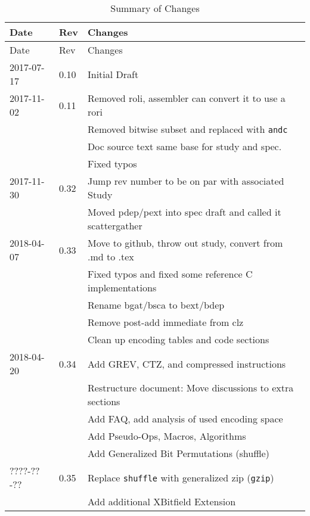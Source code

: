 \documentclass[twoside,11pt]{book}
\begin{document}
\begin{longtable}[c]{@{}lll@{}}
\caption{Summary of Changes}\tabularnewline
\toprule
Date & Rev & Changes\tabularnewline
\midrule
\endfirsthead
\toprule
Date & Rev & Changes\tabularnewline
\midrule
\endhead
2017-07-17 & 0.10 & Initial Draft\tabularnewline
2017-11-02 & 0.11 & Removed roli, assembler can convert it to use a rori\tabularnewline
           &      & Removed bitwise subset and replaced with \texttt{andc}\tabularnewline
           &      & Doc source text same base for study and spec.\tabularnewline
           &      & Fixed typos\tabularnewline
2017-11-30 & 0.32 & Jump rev number to be on par with associated Study\tabularnewline
           &      & Moved pdep/pext into spec draft and called it scattergather\tabularnewline
2018-04-07 & 0.33 & Move to github, throw out study, convert from .md to .tex\tabularnewline
           &      & Fixed typos and fixed some reference C implementations\tabularnewline
           &      & Rename bgat/bsca to bext/bdep\tabularnewline
           &      & Remove post-add immediate from clz\tabularnewline
           &      & Clean up encoding tables and code sections\tabularnewline
2018-04-20 & 0.34 & Add GREV, CTZ, and compressed instructions\tabularnewline
           &      & Restructure document: Move discussions to extra sections\tabularnewline
           &      & Add FAQ, add analysis of used encoding space\tabularnewline
           &      & Add Pseudo-Ops, Macros, Algorithms\tabularnewline
           &      & Add Generalized Bit Permutations (shuffle)\tabularnewline
????-??-?? & 0.35 & Replace {\tt shuffle} with generalized zip ({\tt gzip})\tabularnewline
           &      & Add additional XBitfield Extension\tabularnewline
\bottomrule
\end{longtable}

\nocite{*} %


\end{document}
